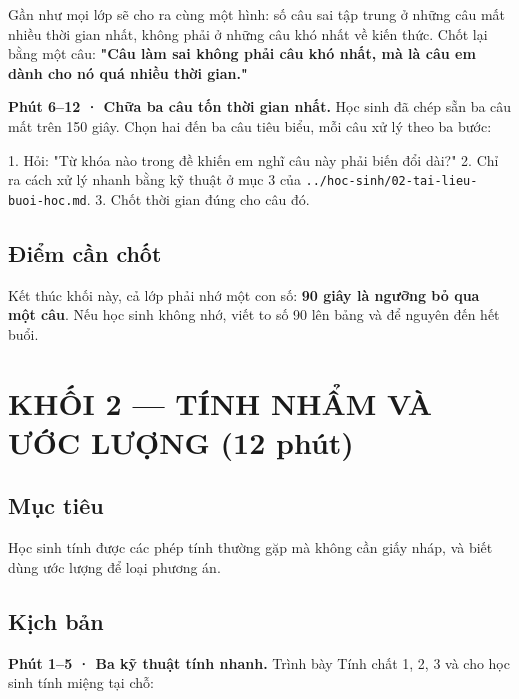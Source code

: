 \documentclass[11pt, a4paper]{article}
\begin{document}
Gần như mọi lớp sẽ cho ra cùng một hình: số câu sai tập trung ở những câu mất nhiều thời gian nhất, không phải ở những câu khó nhất về kiến thức. Chốt lại bằng một câu: \textbf{"Câu làm sai không phải câu khó nhất, mà là câu em dành cho nó quá nhiều thời gian."}

\textbf{Phút 6–12 · Chữa ba câu tốn thời gian nhất.} Học sinh đã chép sẵn ba câu mất trên 150 giây. Chọn hai đến ba câu tiêu biểu, mỗi câu xử lý theo ba bước:

1. Hỏi: "Từ khóa nào trong đề khiến em nghĩ câu này phải biến đổi dài?"
2. Chỉ ra cách xử lý nhanh bằng kỹ thuật ở mục 3 của \texttt{../hoc-sinh/02-tai-lieu-buoi-hoc.md}.
3. Chốt thời gian đúng cho câu đó.

\subsection{Điểm cần chốt}

Kết thúc khối này, cả lớp phải nhớ một con số: \textbf{90 giây là ngưỡng bỏ qua một câu}. Nếu học sinh không nhớ, viết to số 90 lên bảng và để nguyên đến hết buổi.

\section{KHỐI 2 — TÍNH NHẨM VÀ ƯỚC LƯỢNG (12 phút)}

\subsection{Mục tiêu}

Học sinh tính được các phép tính thường gặp mà không cần giấy nháp, và biết dùng ước lượng để loại phương án.

\subsection{Kịch bản}

\textbf{Phút 1–5 · Ba kỹ thuật tính nhanh.} Trình bày Tính chất 1, 2, 3 và cho học sinh tính miệng tại chỗ:

\end{document}
